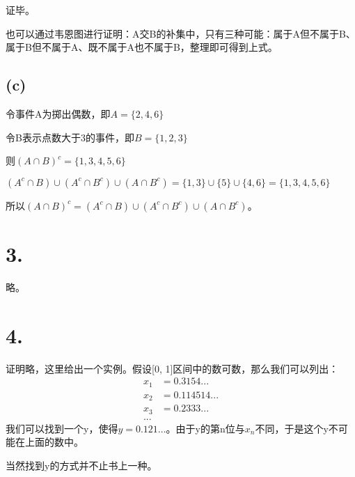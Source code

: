\documentclass[UTF8]{report}
\begin{document}
            证毕。

            也可以通过韦恩图进行证明：A交B的补集中，只有三种可能：属于A但不属于B、属于B但不属于A、既不属于A也不属于B，整理即可得到上式。
        
        \subsection*{(c)}
            令事件A为掷出偶数，即$A = \{2, 4, 6\}$
        
            令B表示点数大于3的事件，即$B = \{1, 2, 3\}$

            则$(A \cap B)^c = \{1, 3, 4, 5, 6\}$

            $(A^c \cap B) \cup  (A^c \cap B^c) \cup (A \cap B^c) = \{1, 3\} \cup \{5\} \cup \{4, 6\} = \{1, 3, 4, 5, 6\}$

            所以$(A \cap B)^c = (A^c \cap B) \cup  (A^c \cap B^c) \cup (A \cap B^c)$。
    \section*{3.}
        略。
    \section*{4.}
        证明略，这里给出一个实例。假设[0, 1]区间中的数可数，那么我们可以列出：
        $$\begin{array}{rcl}
            x_1 &= 0.3154... \\
            x_2 &= 0.114514... \\
            x_3 &= 0.2333... \\
            ...
        \end{array}$$
        我们可以找到一个y，使得$y = 0.121...$。由于y的第n位与$x_n$不同，于是这个y不可能在上面的数中。

        当然找到y的方式并不止书上一种。
\end{document}

